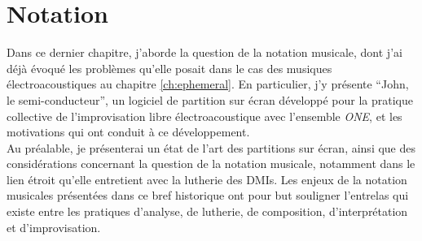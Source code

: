 %
\chapter{Notation}
\label{ch:notation}




\noindent Dans ce dernier chapitre, j'aborde la question de la notation musicale, dont j'ai déjà évoqué les problèmes qu'elle posait dans le cas des musiques électroacoustiques au chapitre \ref{ch:ephemeral}. En particulier, j'y présente ``John, le semi-conducteur'', un logiciel de partition sur écran développé pour la pratique collective de l'improvisation libre électroacoustique avec l'ensemble \textit{ONE}, et les motivations qui ont conduit à ce développement.\\
\indent Au préalable, je présenterai un état de l'art des partitions sur écran, ainsi que des considérations concernant la question de la notation musicale, notamment dans le lien étroit qu'elle entretient avec la lutherie des \glspl{DMI}.
Les enjeux de la notation musicales présentées dans ce bref historique ont pour but souligner l'entrelas qui existe entre les pratiques d'analyse, de lutherie, de composition, d'interprétation et d'improvisation.

